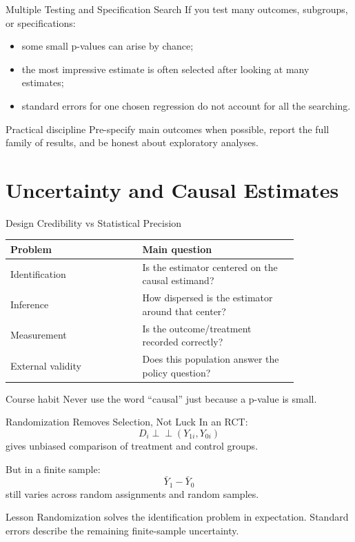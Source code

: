 \documentclass[11pt,aspectratio=169]{beamer}
\newcommand{\indep}{\perp\!\!\!\perp}
\newcommand{\derivbutton}[1]{\vspace{0.4em}\hfill\hyperlink{app:#1}{\beamerbutton{Appendix details}}}
\begin{document}
\begin{frame}{Multiple Testing and Specification Search}
  If you test many outcomes, subgroups, or specifications:
  \begin{itemize}
    \item some small p-values can arise by chance;
    \item the most impressive estimate is often selected after looking at many estimates;
    \item standard errors for one chosen regression do not account for all the searching.
  \end{itemize}
  \begin{block}{Practical discipline}
    Pre-specify main outcomes when possible, report the full family of results, and be honest about exploratory analyses.
  \end{block}
\end{frame}

\section{Uncertainty and Causal Estimates}

\begin{frame}{Design Credibility vs Statistical Precision}
  \begin{center}
  \begin{tabular}{p{0.38\linewidth}p{0.45\linewidth}}
    \toprule
    Problem & Main question \\
    \midrule
    Identification & Is the estimator centered on the causal estimand? \\
    Inference & How dispersed is the estimator around that center? \\
    Measurement & Is the outcome/treatment recorded correctly? \\
    External validity & Does this population answer the policy question? \\
    \bottomrule
  \end{tabular}
  \end{center}
  \vspace{0.4em}
  \begin{block}{Course habit}
    Never use the word ``causal'' just because a p-value is small.
  \end{block}
\end{frame}

\begin{frame}{Randomization Removes Selection, Not Luck}
  \hypertarget{main:randomization-noise}{}
  In an RCT:
  \[
    D_i\indep(Y_{1i},Y_{0i})
  \]
  gives unbiased comparison of treatment and control groups.
  \vspace{0.3em}

  But in a finite sample:
  \[
    \bar{Y}_1-\bar{Y}_0
  \]
  still varies across random assignments and random samples.
  \begin{block}{Lesson}
    Randomization solves the identification problem in expectation. Standard errors describe the remaining finite-sample uncertainty.
  \end{block}
  \derivbutton{randomization-variance}
\end{frame}
\end{document}
